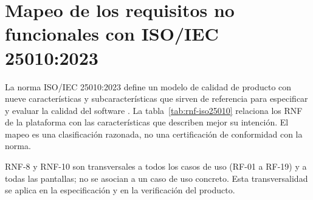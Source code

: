 \chapter{Mapeo de los requisitos no funcionales con ISO/IEC 25010:2023}
\label{cap:rnf-iso25010}

La norma ISO/IEC 25010:2023 define un modelo de calidad de producto con nueve
características y subcaracterísticas que sirven de referencia para especificar y
evaluar la calidad del software \citep{isoiec25010_2023}. La tabla~\ref{tab:rnf-iso25010}
relaciona los RNF de la plataforma con las características que describen mejor
su intención. El mapeo es una clasificación razonada, no una certificación de
conformidad con la norma.

RNF-8 y RNF-10 son transversales a todos los casos de uso (RF-01 a RF-19) y a
todas las pantallas; no se asocian a un caso de uso concreto. Esta
transversalidad se aplica en la especificación y en la verificación del
producto.

